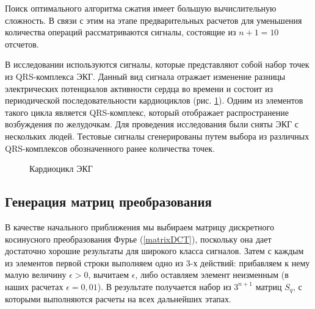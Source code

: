 \documentclass[11pt, oneside, a4paper]{article}
\begin{document}
Поиск оптимального алгоритма сжатия имеет большую вычислительную сложность. В связи с этим на этапе предварительных расчетов для уменьшения количества операций рассматриваются сигналы, состоящие из $n+1=10$ отсчетов. 

В исследовании используются сигналы, которые представляют собой набор точек из QRS-комплекса ЭКГ. Данный вид сигнала отражает изменение разницы электрических потенциалов активности сердца во времени и состоит из периодической последовательности кардиоциклов (рис. \ref{qsr-complex}). Одним из элементов такого цикла является QRS-комплекс, который отображает распространение возбуждения по желудочкам. Для проведения исследования были сняты ЭКГ с нескольких людей. Тестовые сигналы сгенерированы путем выбора из различных QRS-комплексов обозначенного ранее количества точек.

\begin{figure}[h]
	\caption{Кардиоцикл ЭКГ}
	\label{qsr-complex}
\end{figure}

\subsection{Генерация матриц преобразования}

В качестве начального приближения мы выбираем матрицу дискретного косинусного преобразования Фурье (\ref{matrixDCT}), поскольку она дает достаточно хорошие результаты для широкого класса сигналов. Затем с каждым из элементов первой строки выполняем одно из 3-х действий: прибавляем к нему малую величину $\epsilon>0$, вычитаем $\epsilon$, либо оставляем элемент неизменным (в наших расчетах $\epsilon=0,01$). В результате получается набор из $3^{n+1}$ матриц $S_q$, с которыми выполняются расчеты на всех дальнейших этапах.
\end{document}
